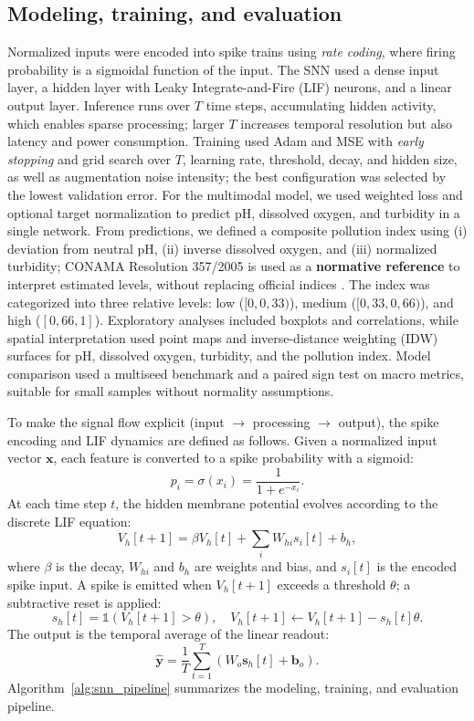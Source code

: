 \subsection{Modeling, training, and evaluation}
Normalized inputs were encoded into spike trains using \textit{rate coding}, where firing probability is a
sigmoidal function of the input. The SNN used a dense input layer, a hidden layer with Leaky Integrate-and-Fire
(LIF) neurons, and a linear output layer. Inference runs over $T$ time steps, accumulating hidden activity,
which enables sparse processing; larger $T$ increases temporal resolution but also latency and power consumption.
Training used Adam and MSE with \textit{early stopping} and grid search over $T$, learning rate, threshold,
decay, and hidden size, as well as augmentation noise intensity; the best configuration was selected by the
lowest validation error. For the multimodal model, we used weighted loss and optional target normalization to
predict pH, dissolved oxygen, and turbidity in a single network. From predictions, we defined a composite
pollution index using (i) deviation from neutral pH, (ii) inverse dissolved oxygen, and (iii) normalized
turbidity; CONAMA Resolution 357/2005 is used as a \textbf{normative reference} to interpret estimated levels,
without replacing official indices \cite{conama3572005}. The index was categorized into three relative levels:
low ($[0,0{,}33)$), medium ($[0{,}33,0{,}66)$), and high ($[0{,}66,1]$). Exploratory analyses included boxplots
and correlations, while spatial interpretation used point maps and inverse-distance weighting (IDW) surfaces
for pH, dissolved oxygen, turbidity, and the pollution index. Model comparison used a multiseed benchmark and
a paired sign test on macro metrics, suitable for small samples without normality assumptions.

To make the signal flow explicit (input $\rightarrow$ processing $\rightarrow$ output), the spike encoding and
LIF dynamics are defined as follows. Given a normalized input vector $\mathbf{x}$, each feature is converted to
a spike probability with a sigmoid:
\begin{equation}
p_i = \sigma(x_i) = \frac{1}{1 + e^{-x_i}}.
\end{equation}
At each time step $t$, the hidden membrane potential evolves according to the discrete LIF equation:
\begin{equation}
V_h[t+1] = \beta V_h[t] + \sum_i W_{hi} s_i[t] + b_h,
\end{equation}
where $\beta$ is the decay, $W_{hi}$ and $b_h$ are weights and bias, and $s_i[t]$ is the encoded spike input.
A spike is emitted when $V_h[t+1]$ exceeds a threshold $\theta$; a subtractive reset is applied:
\begin{equation}
s_h[t] = \mathbb{1}(V_h[t+1] > \theta), \quad V_h[t+1] \leftarrow V_h[t+1] - s_h[t]\theta.
\end{equation}
The output is the temporal average of the linear readout:
\begin{equation}
\hat{\mathbf{y}} = \frac{1}{T}\sum_{t=1}^{T} (W_o \mathbf{s}_h[t] + \mathbf{b}_o).
\end{equation}
Algorithm~\ref{alg:snn_pipeline} summarizes the modeling, training, and evaluation pipeline.

